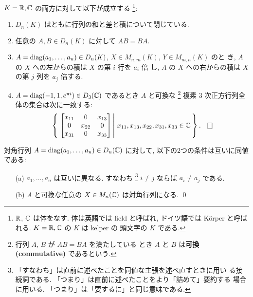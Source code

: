 \documentclass[12pt,twoside]{jarticle}
\begin{document}
\begin{question}
  $K={\mathbb R},{\mathbb C}$ の両方に対して以下が成立する%
  \footnote{${\mathbb R}$, ${\mathbb C}$ は体をなす. 体は英語では field と呼ばれ,
    ドイツ語では K\"orper と呼ばれる.  $K={\mathbb R},{\mathbb C}$ の $K$ は kelper の
    頭文字の $K$ である.}:
  \begin{enumerate}
  \item $D_n(K)$ はともに行列の和と差と積について閉じている.
  \item 任意の $A,B\in D_n(K)$ に対して $AB=BA$.
  \item $A=\mathop{\mathrm{diag}}\nolimits(a_1,\ldots,a_n)\in D_n(K)$, 
    $X\in M_{n,m}(K)$, $Y\in M_{m,n}(K)$ のと
    き, $A$ の $X$ への左からの積は $X$ の第 $i$ 行を $a_i$ 倍
    し, $A$ の $X$ への右からの積は $X$ の第 $j$ 列を $a_j$ 倍する.
  \item $A=\mathop{\mathrm{diag}}\nolimits(-1,1,e^{\pi i})\in D_3({\mathbb C})$ であるとき
    $A$ と可換な%
    \footnote{行列 $A$, $B$ が $AB = BA$ を満たしている
      とき $A$ と $B$ は{\bf 可換 (commutative)} であるという.}%
    複素 $3$ 次正方行列全体の集合は次に一致する:
    \begin{equation*}
      \left\{\,
        \left.
          \begin{bmatrix}
            x_{11} & 0      & x_{13} \\
            0      & x_{22} & 0      \\
            x_{31} & 0      & x_{33} \\
          \end{bmatrix}
        \,\right|\,
        x_{11}, x_{13}, x_{22}, x_{31}, x_{33} \in \C
      \,\right\}.
    \qed
    \end{equation*}
  \end{enumerate}
\end{question}

\begin{question}
  対角行列 $A=\mathop{\mathrm{diag}}\nolimits(a_1,\ldots,a_n)\in D_n({\mathbb C})$ に対して,
  以下の2つの条件は互いに同値である:
  \begin{itemize}
  \item[(a)] $a_1,\ldots,a_n$ は互いに異なる.
    すなわち%
    \footnote{「すなわち」は直前に述べたことを同値な主張を述べ直すときに用い
      る接続詞である.  「つまり」は直前に述べたことをより「詰めて」要約する
      場合に用いる.  「つまり」は「要するに」と同じ意味である.}
    $i\ne j$ ならば $a_i\ne a_j$ である.
  \item[(b)] $A$ と可換な任意の $X\in M_n({\mathbb C})$ は対角行列になる.
    \qed
  \end{itemize}
\end{question}
\end{document}
